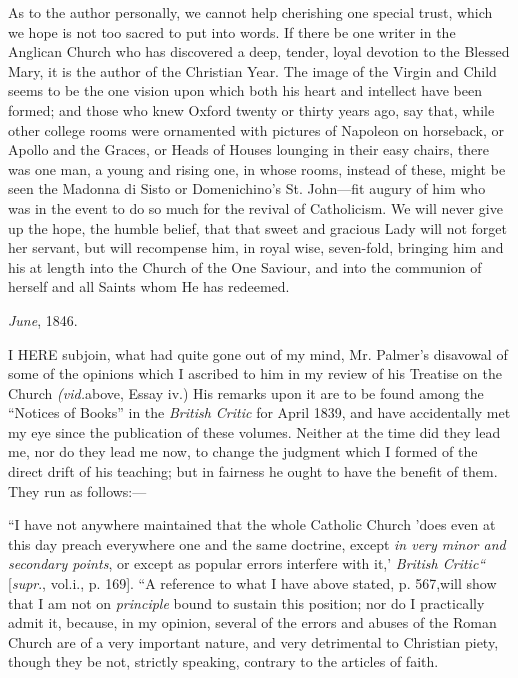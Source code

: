As to the author personally, we cannot help
cherishing one special trust, which we hope is not too sacred to put
into words. If there be one writer in the Anglican Church who has
discovered a deep, tender, loyal devotion to the Blessed Mary, it is
the author of the Christian Year. The image of the Virgin and Child
seems to be the one vision upon which both his heart and intellect have been formed; and those who knew Oxford twenty or thirty
years ago, say that, while other college rooms were ornamented with
pictures of Napoleon on horseback, or Apollo and the Graces, or Heads
of Houses lounging in their easy chairs, there was one man, a young
and rising one, in whose rooms, instead of these, might be seen the
Madonna di Sisto or Domenichino's St. John—fit augury of him who was
in the event to do so much for the revival of Catholicism. We will
never give up the hope, the humble belief, that that sweet and
gracious Lady will not forget her servant, but will recompense him, in
royal wise, seven-fold, bringing him and his at length into the Church
of the One Saviour, and into the communion of herself and all Saints
whom He has redeemed.

\emph{June}, 1846.


I HERE
subjoin, what had quite gone out of my mind, Mr. Palmer's disavowal of
some of the opinions which I ascribed to him in my review of his
Treatise on the Church \emph{(vid.}above,
Essay iv.) His remarks upon it are to be found among the ``Notices of
Books'' in the \emph{British Critic} for
April 1839, and have accidentally met my eye since the publication of
these volumes. Neither at the time did they lead me, nor do they lead
me now, to change the judgment which I formed of the direct drift of
his teaching; but in fairness he ought to have the benefit of them.
They run as follows:—

``I have not anywhere maintained that the whole
Catholic Church 'does even at this day preach everywhere one and the
same doctrine, except \emph{in very
minor and secondary points},
or except as popular errors interfere with it,' \emph{British
Critic}\emph{``}
[\emph{supr}., vol.\emph{}i., p. 169]. ``A reference to what I have above stated, p. 567,\emph{}will show that I am not on \emph{principle} bound to sustain this position; nor do I practically admit it,
because, in my opinion, several of the errors and abuses of the Roman
Church are of a very important nature, and very detrimental to
Christian piety, though they be not, strictly speaking, contrary to
the articles of faith.

